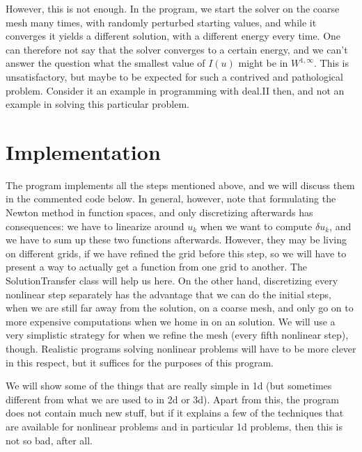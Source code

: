 \documentclass{article}
\begin{document}
However, this is not enough. In the program, we start the solver on the coarse
mesh many times, with randomly perturbed starting values, and while it
converges it yields a different solution, with a different energy every
time. One can therefore not say that the solver converges to a certain energy,
and we can't answer the question what the smallest value of $I(u)$ might be in
$W^{1,\infty}$. This is unsatisfactory, but maybe to be expected for such a
contrived and pathological problem. Consider it an example in programming with
deal.II then, and not an example in solving this particular problem.


\section{Implementation}

The program implements all the steps mentioned above, and we will discuss them
in the commented code below. In general, however, note that formulating the
Newton method in function spaces, and only discretizing afterwards has
consequences: we have to linearize around $u_k$ when we want to compute
$\delta u_k$, and we have to sum up these two functions afterwards.  However,
they may be living on different grids, if we have refined the grid before this
step, so we will have to present a way to actually get a function from one
grid to another. The \textrm{SolutionTransfer} class will help us here. On the
other hand, discretizing every nonlinear step separately has the advantage
that we can do the initial steps, when we are still far away from the
solution, on a coarse mesh, and only go on to more expensive computations when
we home in on an solution. We will use a
very simplistic strategy for when we refine the mesh (every fifth nonlinear
step), though. Realistic programs solving nonlinear problems will have to be more
clever in this respect, but it suffices for the purposes of this program.

We will show some of the things that are really simple in 1d (but sometimes
different from what we are used to in 2d or 3d). Apart from this, the program
does not contain much new stuff, but if it explains a few of the techniques
that are available for nonlinear problems and in particular 1d problems, then
this is not so bad, after all.
\end{document}
